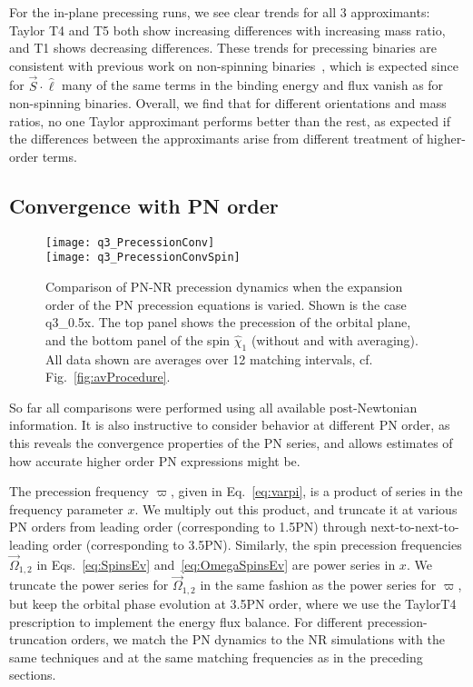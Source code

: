 \documentclass[aps,prd,amsmath,floatfix,twocolumn,superscriptaddress,nofootinbib,showpacs]{revtex4-1}
\newcommand{\ellHat}{\ensuremath{\hat{\ell}}}
\begin{document}
For the in-plane precessing runs, we see clear trends for all 3
approximants: Taylor T4 and T5 both show increasing differences with
increasing mass ratio, and T1 shows decreasing differences. These
trends for precessing binaries are consistent with previous work on
non-spinning binaries~\cite{MacDonald:2012mp}, which is expected since
for $\vec{S}\cdot\ellHat$ many of the same terms in the binding energy
and flux vanish as for non-spinning binaries.  Overall, we find that
for different orientations and mass ratios, no one Taylor approximant
performs better than the rest, as expected if the differences between
the approximants arise from different treatment of higher-order terms.

\subsection{Convergence with PN order}
\label{sec:PNConvergence}

\begin{figure}
  \centering
  \texttt{[image: q3\_PrecessionConv]}\\
  \texttt{[image: q3\_PrecessionConvSpin]}
  \caption{Comparison of PN-NR precession dynamics when the expansion
    order of the PN precession equations is varied.  Shown is the case
    q3\_0.5x. The top panel shows the precession of the orbital plane,
    and the bottom panel of the spin $\hat\chi_1$ (without and with
    averaging). All data shown are averages over 12 matching
    intervals, cf. Fig.~\ref{fig:avProcedure}.}
  \label{fig:q3PrecConv}
\end{figure}

So far all comparisons were performed using all available
post-Newtonian information.  It is also instructive to consider
behavior at different PN order, as this reveals the convergence
properties of the PN series, and allows estimates of how accurate
higher order PN expressions might be.

The precession frequency $\varpi$, given in Eq.~\eqref{eq:varpi}, is a
product of series in the frequency parameter $x$.  We multiply out
this product, and truncate it at various PN orders from leading order
(corresponding to 1.5PN) through next-to-next-to-leading order
(corresponding to 3.5PN).  Similarly, the spin precession frequencies
$\vec\Omega_{1,2}$ in Eqs.~\eqref{eq:SpinsEv}
and~\eqref{eq:OmegaSpinsEv} are power series in $x$.  We truncate the
power series for $\vec\Omega_{1,2}$ in the same fashion as the power
series for $\varpi$, but keep the orbital phase evolution at 3.5PN
order, where we use the TaylorT4 prescription to implement the energy
flux balance.  For different precession-truncation orders, we match
the PN dynamics to the NR simulations with the same techniques and at
the same matching frequencies as in the preceding sections.
\end{document}
